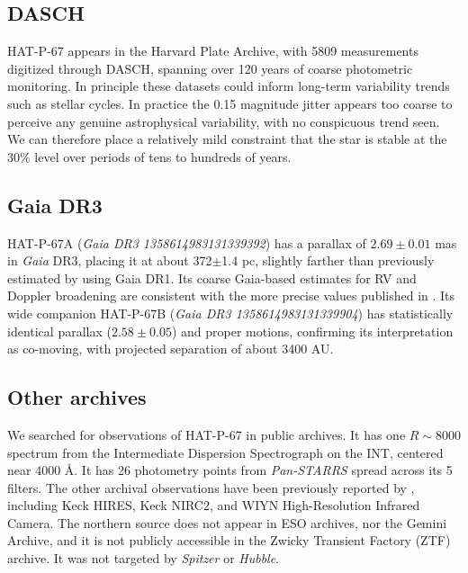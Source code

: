 \documentclass[twocolumn]{aastex631}
\begin{document}
\subsection{DASCH}
HAT-P-67 appears in the Harvard Plate Archive, with 5809 measurements digitized through DASCH, spanning over 120 years of coarse photometric monitoring.  In principle these datasets could inform long-term variability trends such as stellar cycles.  In practice the 0.15 magnitude jitter appears too coarse to perceive any genuine astrophysical variability, with no conspicuous trend seen.  We can therefore place a relatively mild constraint that the star is stable at the $30\%$ level over periods of tens to hundreds of years.

\subsection{Gaia DR3}
HAT-P-67A (\emph{Gaia DR3 1358614983131339392}) has a parallax of $2.69\pm0.01$ mas in \emph{Gaia} DR3, placing it at about 372$\pm$1.4 pc, slightly farther than previously estimated by \citet{2017AJ....153..211Z} using Gaia DR1. Its coarse Gaia-based estimates for RV and Doppler broadening are consistent with the more precise values published in \citet{2017AJ....153..211Z}.  Its wide companion HAT-P-67B (\emph{Gaia DR3 1358614983131339904}) \citep{2019MNRAS.490.5088M} has statistically identical parallax ($2.58\pm0.05$) and proper motions, confirming its interpretation as co-moving, with projected separation of about 3400 AU.

\subsection{Other archives}
We searched for observations of HAT-P-67 in public archives.  It has one $R\sim8000$ spectrum from the Intermediate Dispersion Spectrograph on the INT, centered near 4000 \AA.  It has 26 photometry points from \emph{Pan-STARRS} spread across its 5 filters.  The other archival observations have been previously reported by \citet{2017AJ....153..211Z}, including Keck HIRES, Keck NIRC2, and WIYN High-Resolution Infrared Camera.  The northern source does not appear in ESO archives, nor the Gemini Archive, and it is not publicly accessible in the Zwicky Transient Factory (ZTF) archive.  It was not targeted by \emph{Spitzer} or \emph{Hubble}.
\end{document}

